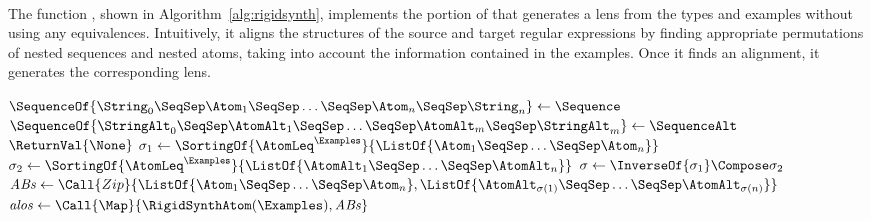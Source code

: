 \documentclass[sigplan,acmsmall]{acmart}
\begin{document}
\paragraph*{\RigidSynth} 
The function \RigidSynth{}, shown in Algorithm~\ref{alg:rigidsynth},
implements the portion of \SynthLens{} that
generates a lens from the types and examples without using any equivalences.
Intuitively, it aligns the structures of the source and target regular
expressions by finding appropriate permutations of nested sequences
and nested atoms, taking into account the information contained in the
examples.  Once it finds an alignment, it generates the
corresponding lens. 

\begin{algorithm}
  \caption{\RigidSynth}
  \label{alg:rigidsynth}
  \begin{algorithmic}[1]
    \Function{\RigidSynthAtom}{$\Atom{},\AtomAlt{},\Examples$}
    \Switch{$(\Atom{}, \AtomAlt)$}
    \Case {(\UserDef, \UserDefAlt)}
    \If {$\UserDef \AtomLeq^\Examples \UserDefAlt \BooleanAnd \UserDefAlt
      \AtomLeq^\Examples \UserDef$}
    \State \ReturnVal{\SomeOf{\IdentityLensOf{\UserDef}}}
    \Else
    \State \ReturnVal{\None}
    \EndIf
    \EndCase
    \Case {(\StarOf{\DNFRegex},\StarOf{\DNFRegexAlt})}
    \Switch{$\RigidSynth(\DNFRegex,\DNFRegexAlt,\Examples)$}
    \CaseTwo{\SomeOf{\DNFLens}}{\ReturnVal{\IterateLensOf{\DNFLens}}}
    \EndCaseTwo
    \CaseTwo {\None}{$\ReturnVal{\None}$}
    \EndCaseTwo
    \EndSwitch
    \EndCase
    \CaseTwo {\_}{\ReturnVal{\None}}
    \EndCaseTwo
    \EndSwitch
    \EndFunction

    \Statex

    \Function{\RigidSynthSequence}{$\Sequence,\SequenceAlt,\Examples$}
    \State $\SequenceOf{\String_0 \SeqSep \Atom_1 \SeqSep \ldots \SeqSep \Atom_n
      \SeqSep \String_n} \gets
    \Sequence$
    \State $\SequenceOf{\StringAlt_0 \SeqSep \AtomAlt_1 \SeqSep \ldots \SeqSep
      \AtomAlt_m \SeqSep \StringAlt_m} \gets
    \SequenceAlt$
    \State $\ReturnVal{\None}$
    \EndIf
    \State $\sigma_1 \gets \SortingOf{\AtomLeq^\Examples}{\ListOf{\Atom_1
        \SeqSep \ldots \SeqSep \Atom_n}}$
    \State $\sigma_2 \gets \SortingOf{\AtomLeq^\Examples}{\ListOf{\AtomAlt_1
        \SeqSep \ldots \SeqSep \AtomAlt_n}}$
    \State $\sigma \gets \InverseOf{\sigma_1} \Compose \sigma_2$
    \State $\mathit{ABs} \gets
    \Call{Zip}{\ListOf{\Atom_1 \SeqSep \ldots \SeqSep
        \Atom_n},\ListOf{\AtomAlt_{\sigma(1)} \SeqSep \ldots \SeqSep \AtomAlt_{\sigma(n)}}}$
    \State $\mathit{alos} \gets
    \Call{\Map}{\RigidSynthAtom(\Examples),\mathit{ABs}}$
    \EndCaseTwo
    \CaseTwo {\None}{$\ReturnVal{\None}$}
    \EndCaseTwo
    \EndSwitch
    \EndFunction


\end{algorithmic}
\end{algorithm}
\end{document}
